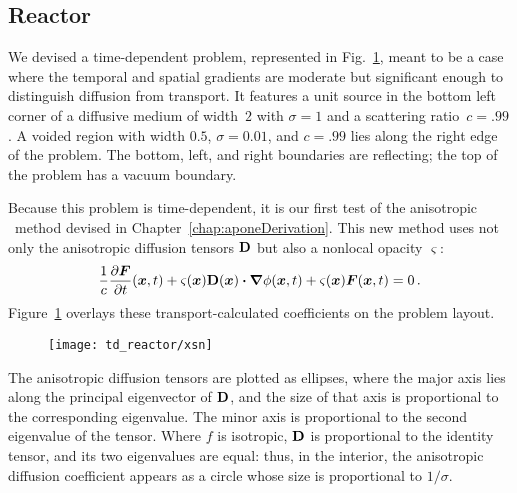 \subsection{Reactor}

We devised a time-dependent problem, represented in
Fig.~\ref{fig:tdReactorProblem}, meant to be a case where the temporal and
spatial gradients are moderate but significant enough to distinguish diffusion
from transport. It features a unit source in the bottom left corner of a
diffusive medium of width~$2$ with
$\sigma=1$ and a scattering ratio~$c=.99$. A voided region with width $0.5$,
$\sigma=0.01$, and $c=.99$ lies along the right edge of the problem. The bottom,
left, and right boundaries are reflecting; the top of the problem has a vacuum
boundary.

Because this problem is time-dependent, it is our first test of the anisotropic
\Pone\ method devised in Chapter~\ref{chap:aponeDerivation}. This new method
uses not only the anisotropic diffusion tensors $\mathbf{D}$ but also a nonlocal
opacity $\varsigma$:
\begin{equation}\tagref{eq:ap1FicksLawFinal}
  \frac{1}{c}\pder{\vec{F}}{t}(\vec{x},t)
  + \varsigma(\vec{x}) \Dtens(\vec{x}) \vd \grad \phi(\vec{x}, t)
  + \varsigma(\vec{x})\vec{F}(\vec{x},t) 
  = 0 \,.
\end{equation}
Figure~\ref{fig:tdReactorProblem} overlays these transport-calculated
coefficients on the problem layout.

\begin{figure}[bp]
  \centering
  \texttt{[image: td\_reactor/xsn]}
  \label{fig:tdReactorProblem}
\end{figure}

The anisotropic diffusion tensors are plotted as ellipses, where the major axis
lies along the principal eigenvector of $\mathbf{D}$, and the size of that axis is
proportional to the corresponding eigenvalue. The minor axis is proportional to
the second eigenvalue of the tensor. Where $f$ is isotropic, $\mathbf{D}$ is
proportional to the identity tensor, and its two eigenvalues are equal: thus, in
the interior, the anisotropic diffusion coefficient appears as a circle whose
size is proportional to $1/\sigma$.

